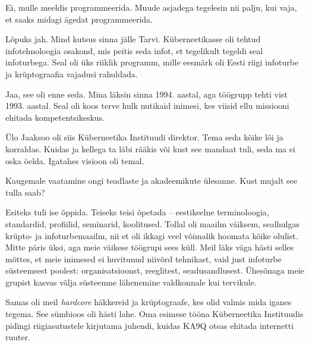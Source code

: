 Ei, mulle meeldis programmeerida. Muude asjadega tegelesin nii palju, 
kui vaja, et saaks midagi ägedat 
programmeerida. 



Lõpuks jah. Mind kutsus sinna jälle Tarvi. 
Küberneetikasse oli tehtud infotehnoloogia osakond, mis peitis seda infot, et 
tegelikult tegeldi seal infoturbega. Seal oli üks riiklik programm, 
mille eesmärk oli Eesti riigi infoturbe ja krüptograafia vajadusi rahuldada. 


Jaa, see oli enne seda. Mina läksin sinna 1994. aastal, aga töögrupp tehti vist 1993. aastal. Seal oli koos terve hulk nutikaid inimesi, kes 
viisid ellu missiooni ehitada kompetentsikeskus.

Ülo Jaaksoo oli siis Küberneetika 
Instituudi direktor. Tema seda kõike lõi ja korraldas. Kuidas ja kellega ta läbi rääkis või kust 
see mandaat tuli, seda ma ei oska öelda. Igatahes visioon oli temal. 


Kaugemale vaatamine ongi teadlaste ja akadeemikute ülesanne. Kust mujalt 
see tulla saab? 


Esiteks tuli ise õppida. Teiseks teisi õpetada -- eestikeelne terminoloogia, 
standardid, profiilid, seminarid, koolitused. Tollal oli maailm 
väiksem, sealhulgas krüpto- ja infoturbemaailm, nii et oli
ikkagi veel võimalik hoomata kõike olulist. Mitte päris üksi,
aga meie väikese töögrupi sees küll. Meil läks väga 
hästi selles mõttes, et meie inimesed ei huvitunud niivõrd tehnikast, vaid just  
infoturbe süsteemsest poolest: organisatsioonst, reeglitest, 
seadusandlusest. Ühesõnaga meie grupist kasvas välja süsteemne lähenemine valdkonnale kui 
tervikule. 

Samas oli meil \emph{hardcore} häkkereid ja krüptograafe, kes olid valmis mida iganes tegema. See 
sümbioos oli hästi lahe. Oma esimese tööna 
Küberneetika Instituudis pidingi riigiasutustele kirjutama 
juhendi, kuidas KA9Q otsas ehitada internetti ruuter. 


